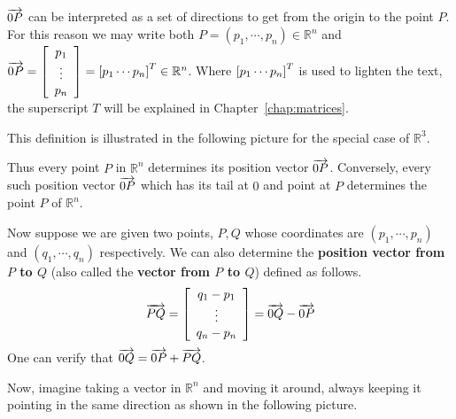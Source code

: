 $\overrightarrow{0P}$ can be interpreted as a set of directions to get from the origin to the point $P$.
For this reason we may write both $P=\left( p_{1},\cdots ,p_{n}\right)  \in \mathbb{R}^{n}$
and  $\overrightarrow{0P}= \left[ 
\begin{array}{c}
p_{1} \\
\vdots \\
p_{n}
\end{array} \right] = \left[ p_{1} \cdots p_{n} \right]^T \in \mathbb{R}^{n}$. Where $\left[ p_{1} \cdots p_{n} \right]^T$ is used to lighten the text, the superscript $T$ will be explained in Chapter~\ref{chap:matrices}.

This definition is illustrated in the following picture for the
special case of $\mathbb{R}^{3}$.

\begin{center}
\end{center}

Thus every point $P$ in $\mathbb{R}^{n}$ determines its position
vector $\overrightarrow{0P}$. Conversely, every such position vector $\overrightarrow{0P}$
which has its tail at $0$ and point at $P$ determines the point $P$ of
$\mathbb{R}^{n}$.

Now suppose we are given two points, $P,Q$ whose
coordinates are $\left( p_{1},\cdots ,p_{n}\right) $ and $\left(
q_{1},\cdots ,q_{n}\right) $ respectively. We can also determine the
\textbf{position vector from $P$ to $Q$} (also called the \textbf{vector from $P$ to $Q$}) defined as follows.
\begin{equation*}
\overrightarrow{PQ} = \left[ \begin{array}{c}
q_{1}-p_{1}\\
 \vdots \\
q_{n}-p_{n}
\end{array}
\right] = \overrightarrow{0Q} - \overrightarrow{0P}
\end{equation*}
One can verify that $\overrightarrow{0Q}=\overrightarrow{0P}+\overrightarrow{PQ}$.

Now, imagine taking a vector in $\mathbb{R}^n$ and moving it around, always
keeping it pointing in the same direction as shown in the following picture.

